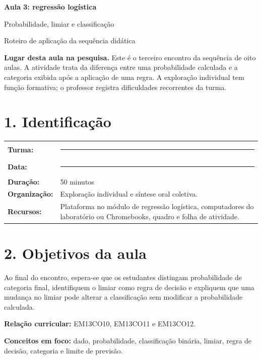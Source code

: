 \documentclass[12pt,a4paper]{article}
\newcommand{\bloco}[1]{%
  \vspace{0.25em}
  \noindent\colorbox{cinza}{\parbox{0.96\linewidth}{#1}}%
  \vspace{0.3em}
}
\begin{document}
\begin{center}
  {\LARGE\bfseries\color{azul} Aula 3: regressão logística}\par
  \vspace{0.25em}
  {\large Probabilidade, limiar e classificação}\par
  \vspace{0.35em}
  {\small Roteiro de aplicação da sequência didática}\par
\end{center}

\bloco{\textbf{Lugar desta aula na pesquisa.} Este é o terceiro encontro da sequência de oito aulas. A atividade trata da diferença entre uma probabilidade calculada e a categoria exibida após a aplicação de uma regra. A exploração individual tem função formativa; o professor registra dificuldades recorrentes da turma.}

\section*{1. Identificação}

\begin{tabularx}{\linewidth}{@{}>{\bfseries}p{4.1cm}X@{}}
Turma: & \rule{8.5cm}{0.35pt} \\
Data: & \rule{8.5cm}{0.35pt} \\
Duração: & 50 minutos \\
Organização: & Exploração individual e síntese oral coletiva. \\
Recursos: & Plataforma no módulo de regressão logística, computadores do laboratório ou Chromebooks, quadro e folha de atividade. \\
\end{tabularx}

\section*{2. Objetivos da aula}

Ao final do encontro, espera-se que os estudantes distingam probabilidade de categoria final, identifiquem o limiar como regra de decisão e expliquem que uma mudança no limiar pode alterar a classificação sem modificar a probabilidade calculada.

\textbf{Relação curricular:} EM13CO10, EM13CO11 e EM13CO12.

\textbf{Conceitos em foco:} dado, probabilidade, classificação binária, limiar, regra de decisão, categoria e limite de previsão.
\end{document}
